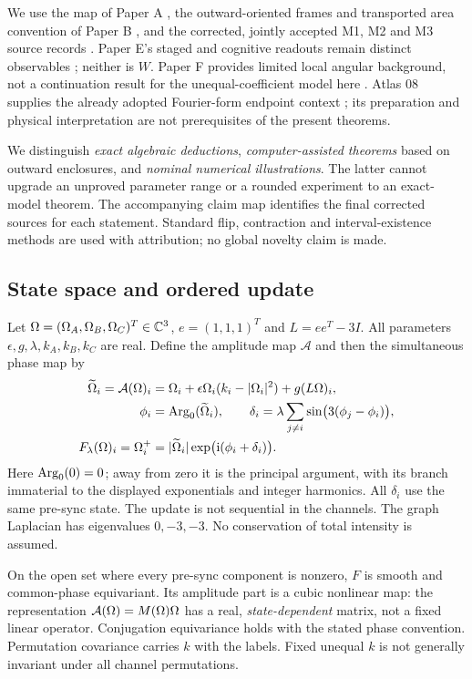 \documentclass[11pt,a4paper]{article}
\begin{document}
We use the map of Paper A \cite{PA}, the outward-oriented frames and transported area convention of Paper B \cite{PB}, and the corrected, jointly accepted M1, M2 and M3 source records \cite{M1,M2,M3}. Paper E's staged and cognitive readouts remain distinct observables \cite{PE}; neither is $W$. Paper F provides limited local angular background, not a continuation result for the unequal-coefficient model here \cite{PF}. Atlas 08 supplies the already adopted Fourier-form endpoint context \cite{Atlas}; its preparation and physical interpretation are not prerequisites of the present theorems.

We distinguish \emph{exact algebraic deductions}, \emph{computer-assisted theorems} based on outward enclosures, and \emph{nominal numerical illustrations}. The latter cannot upgrade an unproved parameter range or a rounded experiment to an exact-model theorem. The accompanying claim map identifies the final corrected sources for each statement. Standard flip, contraction and interval-existence methods are used with attribution; no global novelty claim is made.

\subsection{State space and ordered update}
Let $\Omega=(\Omega_A,\Omega_B,\Omega_C)^T\in\mathbb C^3$, $e=(1,1,1)^T$ and $L=ee^T-3I$. All parameters $\epsilon,g,\lambda,k_A,k_B,k_C$ are real. Define the amplitude map $\mathcal A$ and then the simultaneous phase map by
\begin{align}
 \widetilde{\Omega}_i=\mathcal A(\Omega)_i
 &=\Omega_i+\epsilon\Omega_i(k_i-|\Omega_i|^2)+g(L\Omega)_i,\label{eq:amp}\\
 \phi_i&=\operatorname{Arg}_0(\widetilde{\Omega}_i),\qquad
 \delta_i=\lambda\sum_{j\ne i}\sin\bigl(3(\phi_j-\phi_i)\bigr),\label{eq:phase}\\
 F_\lambda(\Omega)_i=\Omega_i^+
 &=|\widetilde{\Omega}_i|\exp\bigl(\mathrm i(\phi_i+\delta_i)\bigr).\label{eq:full}
\end{align}
Here $\operatorname{Arg}_0(0)=0$; away from zero it is the principal argument, with its branch immaterial to the displayed exponentials and integer harmonics. All $\delta_i$ use the same pre-sync state. The update is not sequential in the channels. The graph Laplacian has eigenvalues $0,-3,-3$. No conservation of total intensity is assumed.

On the open set where every pre-sync component is nonzero, $F$ is smooth and common-phase equivariant. Its amplitude part is a cubic nonlinear map: the representation $\mathcal A(\Omega)=M(\Omega)\Omega$ has a real, \emph{state-dependent} matrix, not a fixed linear operator. Conjugation equivariance holds with the stated phase convention. Permutation covariance carries $k$ with the labels. Fixed unequal $k$ is not generally invariant under all channel permutations.
\end{document}
